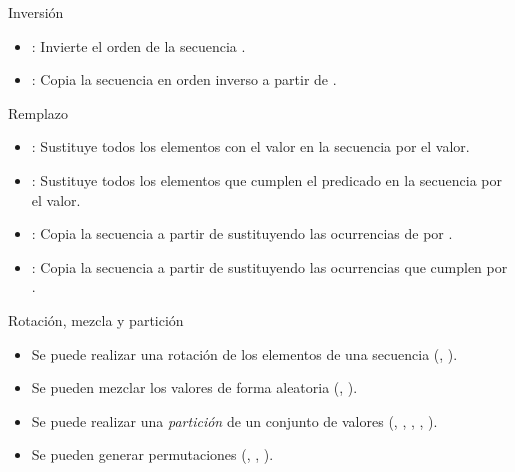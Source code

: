 \begin{frame}[t]{Inversión}
\begin{itemize}
  \item {}: Invierte el orden de la secuencia \cppid{[i,f)}.
  \item {}: Copia la secuencia \cppid{[i,f)} en orden inverso a partir de .
\end{itemize}
\end{frame}

\begin{frame}[t]{Remplazo}
\begin{itemize}
  \item {}: Sustituye todos los elementos con el valor 
        en la secuencia \cppid{[i,f)}
        por el valor.
  \item {}: Sustituye todos los elementos que cumplen el predicado 
        en la secuencia \cppid{[i,f)}
        por el valor.
  \item {}: Copia la secuencia \cppid{[i,f)} a partir de 
        sustituyendo las ocurrencias de  por .
  \item {}: Copia la secuencia \cppid{[i,f)} a partir de 
        sustituyendo las ocurrencias que cumplen  por .
\end{itemize}
\end{frame}

\begin{frame}[t]{Rotación, mezcla y partición}
\begin{itemize}
  \item Se puede realizar una rotación de los elementos de una secuencia (, ).
  \item Se pueden mezclar los valores de forma aleatoria (, ).
  \item Se puede realizar una \emph{partición} de un conjunto de valores (, 
        , , , ).
  \item Se pueden generar permutaciones (, , ).
\end{itemize}
\end{frame}

